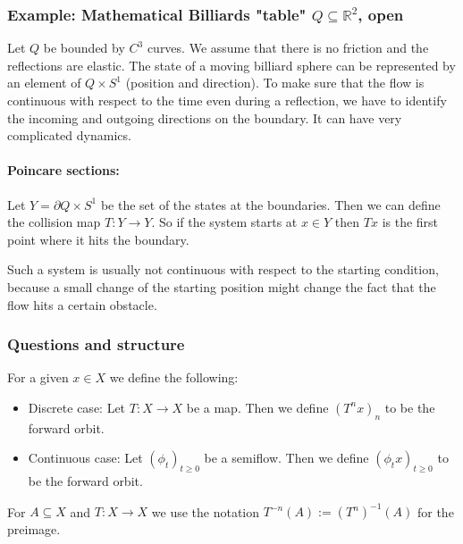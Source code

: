 \documentclass{article}
\newcommand*{\R}{\mathbb{R}}
\begin{document}
\subsubsection{Example: Mathematical Billiards "table" $Q \subseteq \R^2$, open}

Let $Q$ be bounded by $C^3$ curves. We assume that there is no friction and the reflections are elastic. The state of a moving billiard sphere can be represented by an element of $Q\times S^1$ (position and direction). To make sure that the flow is continuous with respect to the time even during a reflection, we have to identify the incoming and outgoing directions on the boundary. It can have very complicated dynamics.

\paragraph{Poincare sections:}
Let $Y = \partial Q\times S^1$ be the set of the states at the boundaries. Then we can define the collision map $T:Y\to Y$. So if the system starts at $x \in Y$ then $Tx$ is the first point where it hits the boundary.

\begin{rem}
    Such a system is usually not continuous with respect to the starting condition, because a small change of the starting position might change the fact that the flow hits a certain obstacle.
\end{rem}

\subsubsection{Questions and structure}

\begin{defin}
    For a given $x\in X$ we define the following:
    \begin{itemize}
        \item Discrete case: Let $T:X\to X$ be a map. Then we define $(T^nx)_n$ to be the forward orbit.

        \item Continuous case: Let $(\phi_t)_{t\geq 0}$ be a semiflow. Then we define $(\phi_tx)_{t\geq0}$ to be the forward orbit.
    \end{itemize}
\end{defin}

\begin{defin}
    For $A\subseteq X$ and $T:X\to X$ we use the notation $T^{-n}(A) := (T^n)^{-1}(A)$ for the preimage.
\end{defin}
\end{document}

